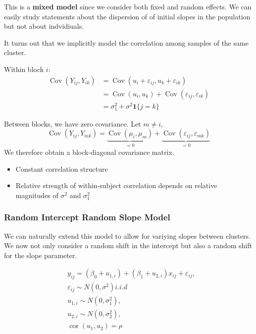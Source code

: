 \documentclass[11pt, %
	oneside, %
	english, %
	onehalfspacing, %
	]{article} %
\numberwithin{equation}{section}
\begin{document}
This is a \textbf{mixed model} since we consider both fixed and random effects. We can easily study statements about the dispersion of of initial slopes in the population but not about indvidiuals.

It turns out that we implicitly model the correlation among samples of the same cluster.

Within block $i$:
$$
    \begin{aligned}
    \operatorname{Cov} \left( Y_{ij}, Y_{ik}\right) &= \operatorname{Cov} \left( u_i + \varepsilon_{ij}, u_k + \varepsilon_{ik}\right) \\
    &=\operatorname{Cov} \left( u_i, u_k\right) + \operatorname{Cov} \left( \varepsilon_{ij}, \varepsilon_{ik}\right) \\
    &=\sigma^2_1 + \sigma^2 \mathbf{1} \{ j = k \}
    \end{aligned}
$$

Between blocks, we have zero covariance. Let $m \neq i$,
\begin{equation*}
    \operatorname{Cov}\left(Y_{i j}, Y_{m k}\right)=\underbrace{\operatorname{Cov}\left(\mu_i, \mu_m\right)}_{=0}+\underbrace{\operatorname{Cov}\left(\varepsilon_{i j}, \varepsilon_{m k}\right)}_{=0}
\end{equation*}
We therefore obtain a block-diagonal covariance matrix.
\begin{itemize}
    \item Constant correlation structure
    \item Relative strength of within-subject correlation depends on relative magnitudes of $\sigma^2$ and $\sigma^2_1$
\end{itemize}


\subsubsection*{Random Intercept Random Slope Model}

We can naturally extend this model to allow for variying slopes between clusters. We now not only consider a random shift in the intercept but also a random shift for the slope parameter.

\begin{equation*}
    \begin{aligned}
        & y_{i j}=\left(\beta_0+u_{1, i}\right)+\left(\beta_1+u_{2, i}\right) x_{i j}+\varepsilon_{i j}, \\
        & \varepsilon_{i j} \sim N\left(0, \sigma^2\right) i . i . d \\
        & u_{1, i} \sim N\left(0, \sigma_1^2\right), \\
        & u_{2, i} \sim N\left(0, \sigma_2^2\right), \\
        & \operatorname{cor}\left(u_1, u_2\right)=\rho
        \end{aligned}
\end{equation*}
\end{document}
